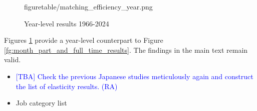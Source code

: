 \documentclass[12pt]{article}
\begin{document}
\begin{figure}[!ht]
\begin{center}
{  {figuretable/matching_efficiency_year.png}}
  \\
  \caption{Year-level results 1966-2024}
  \label{fg:year_results} 
  \end{center}
  \footnotesize
\end{figure} 

Figures \ref{fg:year_results} provide a year-level counterpart to Figure \ref{fg:month_part_and_full_time_results}. 
The findings in the main text remain valid.


\begin{itemize}
    \item \textcolor{blue}{[TBA] Check the previous Japanese studies meticulously again and construct the list of elasticity results. (RA)}
    \item Job category list
\end{itemize}
\end{document}
